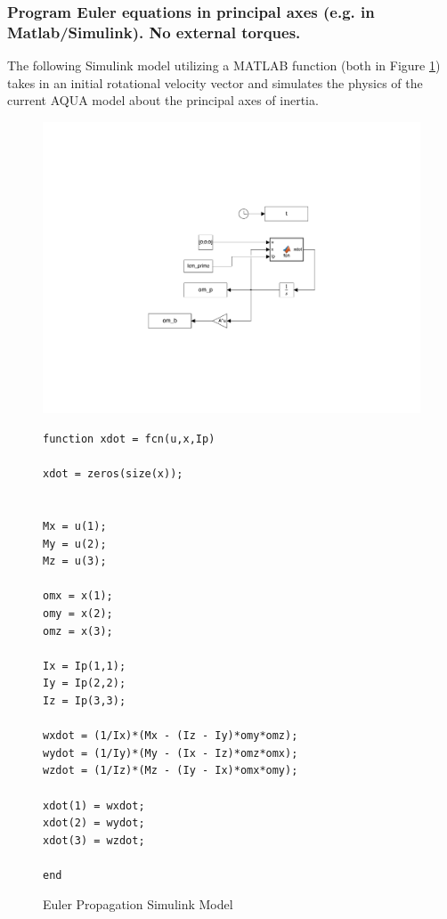 \subsubsection{Program Euler equations in principal axes (e.g. in Matlab/Simulink). No external torques.}

The following Simulink model utilizing a MATLAB function (both in Figure \ref{fig:euler_prop_model}) takes in an initial rotational velocity vector and simulates the physics of the current AQUA model about the principal axes of inertia.

\begin{figure}[H]
    \centering
    \includegraphics[trim={5cm 5cm 5cm 5cm},clip,width = 15cm]{Images/eulerPropagate.pdf}
\end{figure}

\begin{figure} [H]
    \centering
    \begin{lstlisting}
function xdot = fcn(u,x,Ip)

xdot = zeros(size(x));


Mx = u(1);
My = u(2);
Mz = u(3);

omx = x(1);
omy = x(2);
omz = x(3);

Ix = Ip(1,1);
Iy = Ip(2,2);
Iz = Ip(3,3);

wxdot = (1/Ix)*(Mx - (Iz - Iy)*omy*omz);
wydot = (1/Iy)*(My - (Ix - Iz)*omz*omx);
wzdot = (1/Iz)*(Mz - (Iy - Ix)*omx*omy);

xdot(1) = wxdot;
xdot(2) = wydot;
xdot(3) = wzdot;

end
    \end{lstlisting}
    \caption{Euler Propagation Simulink Model}
    \label{fig:euler_prop_model}
\end{figure}


